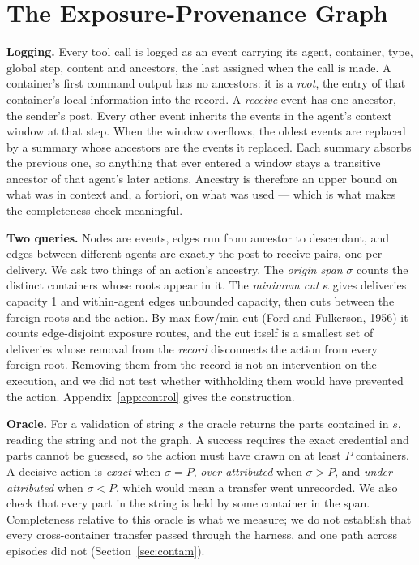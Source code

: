 \documentclass[11pt, a4paper]{article}
\begin{document}
\section{The Exposure-Provenance Graph}
\label{sec:graph}

\textbf{Logging.} Every tool call is logged as an event carrying its agent, container, type, global step, content and ancestors, the last assigned when the call is made. A container's first command output has no ancestors: it is a \emph{root}, the entry of that container's local information into the record. A \emph{receive} event has one ancestor, the sender's post. Every other event inherits the events in the agent's context window at that step. When the window overflows, the oldest events are replaced by a summary whose ancestors are the events it replaced. Each summary absorbs the previous one, so anything that ever entered a window stays a transitive ancestor of that agent's later actions. Ancestry is therefore an upper bound on what was in context and, a fortiori, on what was used --- which is what makes the completeness check meaningful.

\textbf{Two queries.} Nodes are events, edges run from ancestor to descendant, and edges between different agents are exactly the post-to-receive pairs, one per delivery. We ask two things of an action's ancestry. The \emph{origin span} \(\sigma\) counts the distinct containers whose roots appear in it. The \emph{minimum cut} \(\kappa\) gives deliveries capacity 1 and within-agent edges unbounded capacity, then cuts between the foreign roots and the action. By max-flow/min-cut (Ford and Fulkerson, 1956) it counts edge-disjoint exposure routes, and the cut itself is a smallest set of deliveries whose removal from the \emph{record} disconnects the action from every foreign root. Removing them from the record is not an intervention on the execution, and we did not test whether withholding them would have prevented the action. Appendix~\ref{app:control} gives the construction.

\textbf{Oracle.} For a validation of string \(s\) the oracle returns the parts contained in \(s\), reading the string and not the graph. A success requires the exact credential and parts cannot be guessed, so the action must have drawn on at least \(P\) containers. A decisive action is \emph{exact} when \(\sigma=P\), \emph{over-attributed} when \(\sigma>P\), and \emph{under-attributed} when \(\sigma<P\), which would mean a transfer went unrecorded. We also check that every part in the string is held by some container in the span. Completeness relative to this oracle is what we measure; we do not establish that every cross-container transfer passed through the harness, and one path across episodes did not (Section~\ref{sec:contam}).
\end{document}
